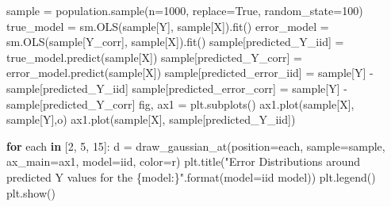 \documentclass[]{tufte-book}
\newenvironment{Shaded}{}{}
\newcommand{\BuiltInTok}[1]{#1}
\newcommand{\ControlFlowTok}[1]{\textcolor[rgb]{0.00,0.44,0.13}{\textbf{#1}}}
\newcommand{\DecValTok}[1]{\textcolor[rgb]{0.25,0.63,0.44}{#1}}
\newcommand{\KeywordTok}[1]{\textcolor[rgb]{0.00,0.44,0.13}{\textbf{#1}}}
\newcommand{\NormalTok}[1]{#1}
\newcommand{\OperatorTok}[1]{\textcolor[rgb]{0.40,0.40,0.40}{#1}}
\newcommand{\SpecialCharTok}[1]{\textcolor[rgb]{0.25,0.44,0.63}{#1}}
\newcommand{\StringTok}[1]{\textcolor[rgb]{0.25,0.44,0.63}{#1}}
\newcommand{\VariableTok}[1]{\textcolor[rgb]{0.10,0.09,0.49}{#1}}
\theoremstyle{definition}
\theoremstyle{definition}
\theoremstyle{definition}
\theoremstyle{remark}
\begin{document}
\begin{Shaded}
\begin{Highlighting}[]
\NormalTok{sample }\OperatorTok{=}\NormalTok{ population.sample(n}\OperatorTok{=}\DecValTok{1000}\NormalTok{, replace}\OperatorTok{=}\VariableTok{True}\NormalTok{, random\_state}\OperatorTok{=}\DecValTok{100}\NormalTok{)}
\NormalTok{true\_model }\OperatorTok{=}\NormalTok{ sm.OLS(sample[}\StringTok{\textquotesingle{}Y\textquotesingle{}}\NormalTok{], sample[}\StringTok{\textquotesingle{}X\textquotesingle{}}\NormalTok{]).fit()}
\NormalTok{error\_model }\OperatorTok{=}\NormalTok{ sm.OLS(sample[}\StringTok{\textquotesingle{}Y\_corr\textquotesingle{}}\NormalTok{], sample[}\StringTok{\textquotesingle{}X\textquotesingle{}}\NormalTok{]).fit()}
\NormalTok{sample[}\StringTok{\textquotesingle{}predicted\_Y\_iid\textquotesingle{}}\NormalTok{] }\OperatorTok{=}\NormalTok{ true\_model.predict(sample[}\StringTok{\textquotesingle{}X\textquotesingle{}}\NormalTok{])}
\NormalTok{sample[}\StringTok{\textquotesingle{}predicted\_Y\_corr\textquotesingle{}}\NormalTok{] }\OperatorTok{=}\NormalTok{ error\_model.predict(sample[}\StringTok{\textquotesingle{}X\textquotesingle{}}\NormalTok{])}
\NormalTok{sample[}\StringTok{\textquotesingle{}predicted\_error\_iid\textquotesingle{}}\NormalTok{] }\OperatorTok{=}\NormalTok{ sample[}\StringTok{\textquotesingle{}Y\textquotesingle{}}\NormalTok{] }\OperatorTok{{-}}\NormalTok{ sample[}\StringTok{\textquotesingle{}predicted\_Y\_iid\textquotesingle{}}\NormalTok{]}
\NormalTok{sample[}\StringTok{\textquotesingle{}predicted\_error\_corr\textquotesingle{}}\NormalTok{] }\OperatorTok{=}\NormalTok{ sample[}\StringTok{\textquotesingle{}Y\textquotesingle{}}\NormalTok{] }\OperatorTok{{-}}\NormalTok{ sample[}\StringTok{\textquotesingle{}predicted\_Y\_corr\textquotesingle{}}\NormalTok{]}
\NormalTok{fig, ax1 }\OperatorTok{=}\NormalTok{ plt.subplots()}
\NormalTok{ax1.plot(sample[}\StringTok{\textquotesingle{}X\textquotesingle{}}\NormalTok{], sample[}\StringTok{\textquotesingle{}Y\textquotesingle{}}\NormalTok{],}\StringTok{\textquotesingle{}o\textquotesingle{}}\NormalTok{)}
\NormalTok{ax1.plot(sample[}\StringTok{\textquotesingle{}X\textquotesingle{}}\NormalTok{], sample[}\StringTok{\textquotesingle{}predicted\_Y\_iid\textquotesingle{}}\NormalTok{])}

\ControlFlowTok{for}\NormalTok{ each }\KeywordTok{in}\NormalTok{ [}\DecValTok{2}\NormalTok{, }\DecValTok{5}\NormalTok{,  }\DecValTok{15}\NormalTok{]:}
\NormalTok{    d }\OperatorTok{=}\NormalTok{ draw\_gaussian\_at(position}\OperatorTok{=}\NormalTok{each, sample}\OperatorTok{=}\NormalTok{sample, }
\NormalTok{    ax\_main}\OperatorTok{=}\NormalTok{ax1, model}\OperatorTok{=}\StringTok{\textquotesingle{}iid\textquotesingle{}}\NormalTok{, color}\OperatorTok{=}\StringTok{\textquotesingle{}r\textquotesingle{}}\NormalTok{)}
\NormalTok{plt.title(}\StringTok{"Error Distributions around predicted Y values for the }\SpecialCharTok{\{model:\}}\StringTok{"}\NormalTok{.}\BuiltInTok{format}\NormalTok{(model}\OperatorTok{=}\StringTok{\textquotesingle{}iid model\textquotesingle{}}\NormalTok{))}
\NormalTok{plt.legend()}
\NormalTok{plt.show()}
\end{Highlighting}
\end{Shaded}
\end{document}
